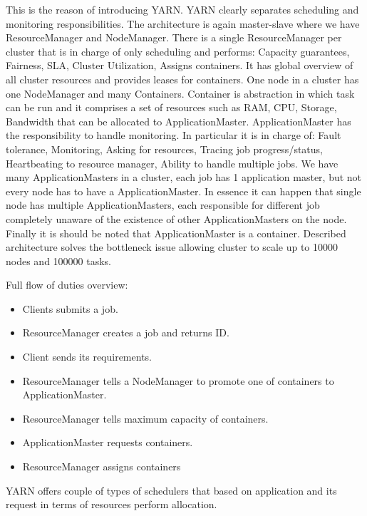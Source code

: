 This is the reason of introducing YARN. YARN clearly separates scheduling and monitoring responsibilities. The architecture is again master-slave where we have ResourceManager and NodeManager. There is a single ResourceManager per cluster that is in charge of only scheduling and performs: Capacity guarantees, Fairness, SLA, Cluster Utilization, Assigns containers. It has global overview of all cluster resources and provides leases for containers. One node in a cluster has one NodeManager and many Containers. Container is abstraction in which task can be run and it comprises a set of resources such as RAM, CPU, Storage, Bandwidth that can be allocated to ApplicationMaster. ApplicationMaster has the responsibility to handle monitoring. In particular it is in charge of: Fault tolerance, Monitoring, Asking for resources, Tracing job progress/status, Heartbeating to resource manager, Ability to handle multiple jobs. We have many ApplicationMasters in a cluster, each job has 1 application master, but not every node has to have a ApplicationMaster. In essence it can happen that single node has multiple ApplicationMasters, each responsible for different job completely unaware of the existence of other ApplicationMasters on the node. Finally it is should be noted that ApplicationMaster is a container. Described architecture solves the bottleneck issue allowing cluster to scale up to 10000 nodes and 100000 tasks. 

Full flow of duties overview:
\begin{itemize}
	\item Clients submits a job. 
	\item ResourceManager creates a job and returns ID. \item Client sends its requirements. 
	\item ResourceManager tells a NodeManager to promote one of containers to ApplicationMaster. 
	\item ResourceManager tells maximum capacity of containers. 
	\item ApplicationMaster requests containers. 
	\item ResourceManager assigns containers 
\end{itemize}


YARN offers couple of types of schedulers that based on application and its request in terms of resources perform allocation.

